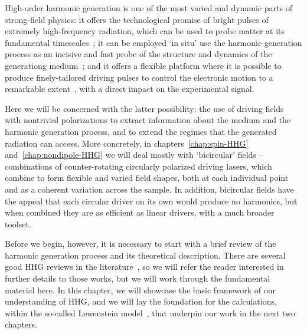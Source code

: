 



High-order harmonic generation is one of the most varied and dynamic parts of strong-field physics: it offers the technological promise of bright pulses of extremely high-fre\-quen\-cy radiation, which can be used to probe matter at its fundamental timescales~\cite{popmintchev_record_2012, calegari_phenylalanine_2014}; it can be employed `in situ' use the harmonic generation process as an incisive and fast probe of the structure and dynamics of the generationg medium~\cite{mairesse_high-harmonic-spectroscopy_2010}; and it offers a flexible platform where it is possible to produce finely-tailored driving pulses to control the electronic motion to a remarkable extent~\cite{ chipperfield_ideal_2009, brugnera_hhg-orthogonal_2011}, with a direct impact on the experimental signal.


Here we will be concerned with the latter possibility: the use of driving fields with nontrivial polarizations to extract information about the medium and the harmonic generation process, and to extend the regimes that the generated radiation can access. More concretely, in chapters~\ref{chap:spin-HHG} and~\ref{chap:nondipole-HHG} we will deal mostly with `bicircular' fields -- combinations of counter-rotating circularly polarized driving lasers, which combine to form flexible and varied field shapes, both at each individual point and as a coherent variation across the sample. In addition, bicircular fields have the appeal that each circular driver on its own would produce no harmonics, but when combined they are as efficient as linear drivers, with a much broader toolset.

Before we begin, however, it is necessary to start with a brief review of the harmonic generation process and its theoretical description. There are several good HHG reviews in the literature~\cite{ JoachainHHGReview, corkum_hhg-review_2007, HHGTutorial, kohler_chapter_2012}, so we will refer the reader interested in further details to those works, but we will work through the fundamental material here. In this chapter, we will showcase the basic framework of our understanding of HHG, and we will lay the foundation for the calculations, within the so-called Lewenstein model~\cite{LewensteinHHG}, that underpin our work in the next two chapters. 

